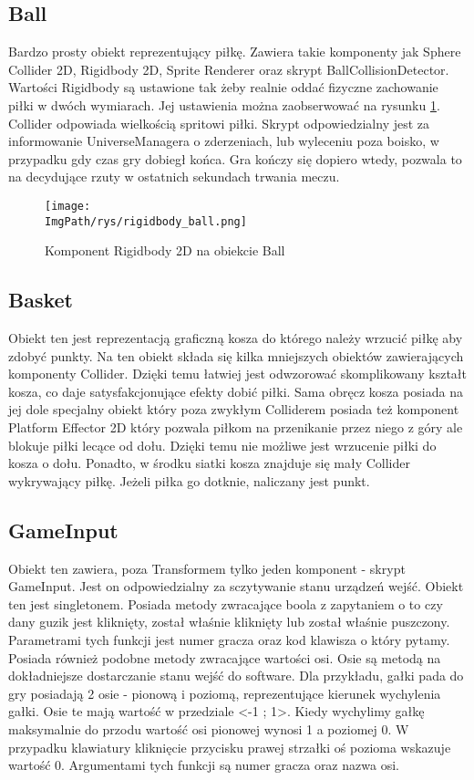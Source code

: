 \documentclass[a4paper,12pt,twoside,openany]{report}
\newcommand{\ImgPath}{.}
\begin{document}
\subsection{Ball}
\label{ball}
Bardzo prosty obiekt reprezentujący piłkę. Zawiera takie komponenty jak Sphere Collider 2D, Rigidbody 2D, Sprite Renderer oraz skrypt BallCollisionDetector. Wartości Rigidbody są ustawione tak żeby realnie oddać fizyczne zachowanie piłki w dwóch wymiarach. Jej ustawienia można zaobserwować na rysunku \ref{rigidbody_ball}. Collider odpowiada wielkością spritowi piłki. Skrypt odpowiedzialny jest za informowanie UniverseManagera o zderzeniach, lub wyleceniu poza boisko, w przypadku gdy czas gry dobiegł końca. Gra kończy się dopiero wtedy, pozwala to na decydujące rzuty w ostatnich sekundach trwania meczu.

\begin{figure}[H]
	\begin{center}
\centering
\texttt{[image: \\ImgPath/rys/rigidbody\_ball.png]}
\end{center}
	\caption{Komponent Rigidbody 2D na obiekcie Ball}
	\label{rigidbody_ball}
\end{figure}

\subsection{Basket}
\label{basket}

Obiekt ten jest reprezentacją graficzną kosza do którego należy wrzucić piłkę aby zdobyć punkty. Na ten obiekt składa się kilka mniejszych obiektów zawierających komponenty Collider. Dzięki temu łatwiej jest odwzorować skomplikowany kształt kosza, co daje satysfakcjonujące efekty dobić piłki. Sama obręcz kosza posiada na jej dole specjalny obiekt który poza zwykłym Colliderem posiada też komponent Platform Effector 2D który pozwala piłkom na przenikanie przez niego z góry ale blokuje piłki lecące od dołu. Dzięki temu nie możliwe jest wrzucenie piłki do kosza o dołu. Ponadto, w środku siatki kosza znajduje się mały Collider wykrywający piłkę. Jeżeli piłka go dotknie, naliczany jest punkt.

\subsection{GameInput}
\label{gameinput}
Obiekt ten zawiera, poza Transformem tylko jeden komponent - skrypt GameInput. Jest on odpowiedzialny za sczytywanie stanu urządzeń wejść. Obiekt ten jest singletonem. Posiada metody zwracające boola z zapytaniem o to czy dany guzik jest kliknięty, został właśnie kliknięty lub został właśnie puszczony. Parametrami tych funkcji jest numer gracza oraz kod klawisza o który pytamy. Posiada również podobne metody zwracające wartości osi. Osie są metodą na dokładniejsze dostarczanie stanu wejść do software. Dla przykładu, gałki pada do gry posiadają 2 osie - pionową i poziomą, reprezentujące kierunek wychylenia gałki. Osie te mają wartość w przedziale <-1 ; 1>. Kiedy wychylimy gałkę maksymalnie do przodu wartość osi pionowej wynosi 1 a poziomej 0. W przypadku klawiatury kliknięcie przycisku prawej strzałki oś pozioma wskazuje wartość 0. Argumentami tych funkcji są numer gracza oraz nazwa osi. 
\end{document}
